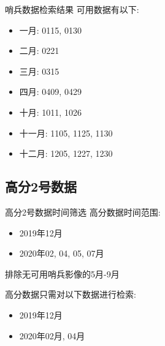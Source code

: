 \begin{frame}{哨兵数据检索结果}
    \small 
    可用数据有以下:
    \begin{itemize}
        \item 一月: 0115, 0130
        \item 二月: 0221
        \item 三月: 0315
        \item 四月: 0409, 0429
        \item 十月: 1011, 1026
        \item 十一月: 1105, 1125, 1130
        \item 十二月: 1205, 1227, 1230
    \end{itemize}
\end{frame}

\subsection{高分2号数据}
\begin{frame}{高分2号数据时间筛选}    
    高分数据时间范围: 
    \begin{itemize}
        \item 2019年12月
        \item 2020年02, 04, 05, 07月
    \end{itemize}
    
    \vspace*{1cm}
    排除无可用哨兵影像的5月-9月

    高分数据只需对以下数据进行检索:
    \begin{itemize}
        \item 2019年12月
        \item 2020年02月, 04月
    \end{itemize}
\end{frame}

